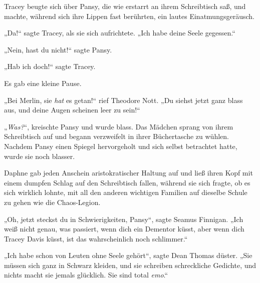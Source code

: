 Tracey beugte sich über Pansy, die wie erstarrt an ihrem Schreibtisch saß, und machte, während sich ihre Lippen fast berührten, ein lautes Einatmungsgeräusch.

„Da!“ sagte Tracey, als sie sich aufrichtete.
„Ich habe deine Seele gegessen.“

„Nein, hast du nicht!“ sagte Pansy.

„Hab ich doch!“ sagte Tracey.

Es gab eine kleine Pause.

„Bei Merlin, sie \emph{hat} es getan!“ rief Theodore Nott.
„Du siehst jetzt ganz blass aus, und deine Augen scheinen leer zu sein!“

„\emph{Was?}“, kreischte Pansy und wurde blass. Das Mädchen sprang von ihrem Schreibtisch auf und begann verzweifelt in ihrer Büchertasche zu wühlen. Nachdem Pansy einen Spiegel hervorgeholt und sich selbst betrachtet hatte, wurde sie noch blasser.

Daphne gab jeden Anschein aristokratischer Haltung auf und ließ ihren Kopf mit einem dumpfen Schlag auf den Schreibtisch fallen, während sie sich fragte, ob es sich wirklich lohnte, mit all den anderen wichtigen Familien auf dieselbe Schule zu gehen wie die Chaos-Legion.

„Oh, jetzt steckst du in Schwierigkeiten, Pansy“, sagte Seamus Finnigan.
„Ich weiß nicht genau, was passiert, wenn dich ein Dementor küsst, aber wenn dich Tracey Davis küsst, ist das wahrscheinlich noch schlimmer.“

„Ich habe schon von Leuten ohne Seele gehört“, sagte Dean Thomas düster.
„Sie müssen sich ganz in Schwarz kleiden, und sie schreiben schreckliche Gedichte, und nichts macht sie jemals glücklich. Sie sind total \emph{emo}.“

